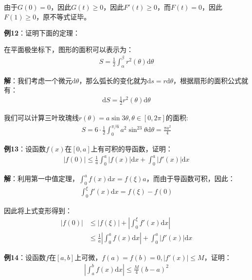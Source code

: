 \documentclass{ctexart}
\let\oldtextbf\textbf %
\renewcommand{\textbf}[1]{\textcolor{btex}{\oldtextbf{#1}}} %
\begin{document}
由于$G(0)=0$，因此$G(t)\geq 0$，因此$F'(t)\geq 0$，而$F(t)=0$，因此$F(1)\geq 0$，原不等式证毕。

\textbf{例12}：证明下面的定理：
\begin{tcolorbox}[
    colback=bac1,     %
    colframe=fra1,   %
    coltitle=white,             %
    coltext=tex1,
    title=平面极坐标系下的面积,
    fonttitle=\bfseries,        %
arc=3mm,                     %
breakable
]
在平面极坐标下，图形的面积可以表示为：
\begin{align*}
    S=\frac{1}{2}\int_\alpha^\beta r^2(\theta)\mathrm{d}\theta\tag{5-17}
\end{align*}
\end{tcolorbox}

\textbf{解}：我们考虑一个微元$\mathrm{d}\theta$，那么弧长的变化就为$\mathrm{d}s=r\mathrm{d}\theta$，根据扇形的面积公式就有：
\begin{align*}
    \mathrm{d}S=\frac{1}{2}r^2(\theta)\mathrm{d}\theta
\end{align*}

我们可以计算三叶玫瑰线$r(\theta)=a\sin 3\theta,\theta\in[0,2\pi]$的面积:
\begin{align*}
    S=6\cdot\frac{1}{2}\int_0^{\pi/6}a^2\sin^23\theta\mathrm{d}\theta=\frac{\pi a^2}{4}
\end{align*}

\textbf{例13}：设函数$f(x)$在$[0,a]$上有可积的导函数，证明：
\begin{align*}
    |f(0)|\leq\frac{1}{a}\int_0^a|f(x)|\mathrm{d}x+\int_0^a|f'(x)|\mathrm{d}x
\end{align*}

\textbf{解}：利用第一中值定理，$\int_0^af(x)\mathrm{d}x=f(\xi)a$，而由于导函数可积，因此：
\begin{align*}
    \int_0^\xi f'(x)\mathrm{d}x=f(\xi)-f(0)
\end{align*}

因此将上式变形得到：
\begin{align*}
   |f(0)|&\leq |f(\xi)|+|\int_0^\xi f'(x)\mathrm{d}x | \\
&\leq \frac{1}{a}|\int_0^af(x)\mathrm{d}x | +\int_0^a|f'(x)|\mathrm{d}x 
\end{align*}

\textbf{例14}：设函数$f$在$[a,b]$上可微，$f(a)=f(b)=0,|f'(x)|\leq M$，证明：
\begin{align*}
    \left|\int_a^b f(x)\mathrm{d}x\right|\leq\frac{M}{4}(b-a)^2
\end{align*}
\end{document}
